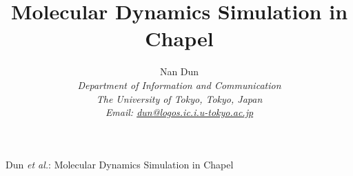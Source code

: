 \documentclass[a4paper,10pt,technote,compsoc,onecolumn]{IEEEtran}
\numberwithin{equation}{section}
\begin{document}
\title{Molecular Dynamics Simulation in Chapel}

\author{{\rm Nan Dun} \\ 
{\it Department of Information and Communication} \\
{\it The University of Tokyo, Tokyo, Japan} \\
{\it Email: \href{mailto:dun@logos.ic.i.u-tokyo.ac.jp}{dun@logos.ic.i.u-tokyo.ac.jp}}
}

%
{Dun \MakeLowercase{\textit{et al.}}: Molecular Dynamics Simulation in Chapel}




\maketitle

\IEEEdisplaynotcompsoctitleabstractindextext
\end{document}
